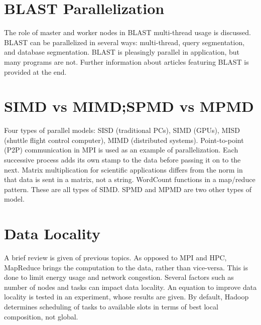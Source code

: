 \section{BLAST Parallelization}

The role of master and worker nodes in BLAST multi-thread usage is
discussed. BLAST can be parallelized in several ways: multi-thread,
query segmentation, and database segmentation. BLAST is pleasingly
parallel in application, but many programs are not. Further information
about articles featuring BLAST is provided at the end.




\section{SIMD vs MIMD;SPMD vs MPMD}

Four types of parallel models: SISD (traditional PCs), SIMD (GPUs), MISD
(shuttle flight control computer), MIMD (distributed systems).
Point-to-point (P2P) communication in MPI is used as an example of
parallelization. Each successive process adds its own stamp to the data
before passing it on to the next. Matrix multiplication for scientific
applications differs from the norm in that data is sent in a matrix, not
a string. WordCount functions in a map/reduce pattern. These are all
types of SIMD. SPMD and MPMD are two other types of model.




\section{Data Locality}

A brief review is given of previous topics. As opposed to MPI and HPC,
MapReduce brings the computation to the data, rather than vice-versa.
This is done to limit energy usage and network congestion. Several
factors such as number of nodes and tasks can impact data locality. An
equation to improve data locality is tested in an experiment, whose
results are given. By default, Hadoop determines scheduling of tasks to
available slots in terms of best local composition, not global.

